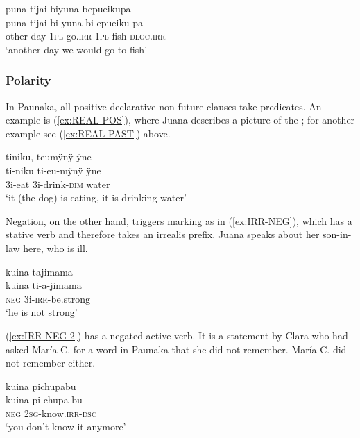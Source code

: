\ea\label{ex:IRR-HAB-PAST}
\begingl 
\glpreamble puna tijai biyuna bepueikupa\\
\gla puna tijai bi-yuna bi-epueiku-pa\\ 
\glb other day 1\textsc{pl}-go.\textsc{irr} 1\textsc{pl}-fish-\textsc{dloc.irr}\\ 
\glft ‘another day we would go to fish’\\ 
\endgl
 \trailingcitation{[jxx-p120430l-1.060]}
\xe
{}

\subsubsection{Polarity}\label{par:Polarity}

In Paunaka, all positive declarative non-future clauses take  predicates. An example is (\ref{ex:REAL-POS}), where Juana describes a picture of the ; for another example see (\ref{ex:REAL-PAST}) above.

\ea\label{ex:REAL-POS}
\begingl 
\glpreamble tiniku, teumÿnÿ ÿne\\
\gla ti-niku ti-eu-mÿnÿ ÿne\\ 
\glb 3i-eat 3i-drink-\textsc{dim} water\\ 
\glft ‘it (the dog) is eating, it is drinking water’\\ 
\endgl
 \trailingcitation{[jxx-a120516l-a.018]}
\xe

Negation, on the other hand, triggers  marking as in (\ref{ex:IRR-NEG}), which has a stative verb and therefore takes an irrealis prefix. Juana speaks about her son-in-law here, who is ill.

\ea\label{ex:IRR-NEG}
\begingl 
\glpreamble kuina tajimama\\
\gla kuina ti-a-jimama\\ 
\glb \textsc{neg} 3i-\textsc{irr}-be.strong\\ 
\glft ‘he is not strong’\\ 
\endgl
 \trailingcitation{[jxx-p110923l-1.053]}
\xe

(\ref{ex:IRR-NEG-2}) has a negated active verb. It is a statement by Clara who had asked María C. for a word in Paunaka that she did not remember. María C. did not remember either.

\ea\label{ex:IRR-NEG-2}
\begingl
\glpreamble kuina pichupabu\\
\gla kuina pi-chupa-bu\\
\glb \textsc{neg} 2\textsc{sg}-know.\textsc{irr}-\textsc{dsc}\\
\glft ‘you don’t know it anymore’
\endgl
 \trailingcitation{[cux-c120414ls-2.243]}
\xe

